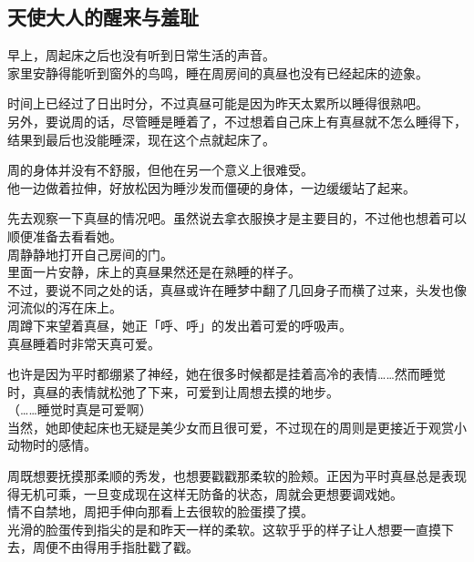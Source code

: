 \subsection{天使大人的醒来与羞耻}

早上，周起床之后也没有听到日常生活的声音。\\

家里安静得能听到窗外的鸟鸣，睡在周房间的真昼也没有已经起床的迹象。

时间上已经过了日出时分，不过真昼可能是因为昨天太累所以睡得很熟吧。\\

另外，要说周的话，尽管睡是睡着了，不过想着自己床上有真昼就不怎么睡得下，结果到最后也没能睡深，现在这个点就起床了。

周的身体并没有不舒服，但他在另一个意义上很难受。\\

他一边做着拉伸，好放松因为睡沙发而僵硬的身体，一边缓缓站了起来。

先去观察一下真昼的情况吧。虽然说去拿衣服换才是主要目的，不过他也想着可以顺便准备去看看她。\\

周静静地打开自己房间的门。\\

里面一片安静，床上的真昼果然还是在熟睡的样子。\\

不过，要说不同之处的话，真昼或许在睡梦中翻了几回身子而横了过来，头发也像河流似的泻在床上。\\

周蹲下来望着真昼，她正「呼、呼」的发出着可爱的呼吸声。\\

真昼睡着时非常天真可爱。

也许是因为平时都绷紧了神经，她在很多时候都是挂着高冷的表情……然而睡觉时，真昼的表情就松弛了下来，可爱到让周想去摸的地步。\\

（……睡觉时真是可爱啊）\\

当然，她即使起床也无疑是美少女而且很可爱，不过现在的周则是更接近于观赏小动物时的感情。

周既想要抚摸那柔顺的秀发，也想要戳戳那柔软的脸颊。正因为平时真昼总是表现得无机可乘，一旦变成现在这样无防备的状态，周就会更想要调戏她。\\

情不自禁地，周把手伸向那看上去很软的脸蛋摸了摸。\\

光滑的脸蛋传到指尖的是和昨天一样的柔软。这软乎乎的样子让人想要一直摸下去，周便不由得用手指肚戳了戳。\\

